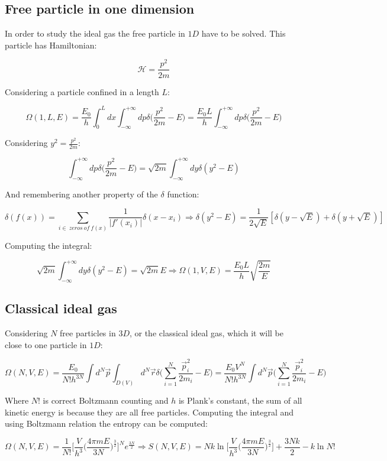 	\subsection{Free particle in one dimension}
	In order to study the ideal gas the free particle in $1D$ have to be solved.
	This particle has Hamiltonian:

	$$\mathcal{H} = \frac{p^2}{2m}$$

	Considering a particle confined in a length $L$:

	$$\Omega(1, L, E) = \frac{E_0}{h}\int_0^Ldx\int_{-\infty}^{+\infty}dp\delta\biggl(\frac{p^2}{2m}-E\biggr) = \frac{E_0L}{h}\int_{-\infty}^{+\infty}dp\delta\biggl(\frac{p^2}{2m}-E\biggr)$$

	Considering $y^2 = \frac{p^2}{2m}$:

	$$\int_{-\infty}^{+\infty}dp\delta\biggl(\frac{p^2}{2m}-E\biggr) = \sqrt{2m}\int_{-\infty}^{+\infty}dy\delta(y^2-E)$$

	And remembering another property of the $\delta$ function:

	$$\delta(f(x)) = \sum\limits_{i\in\ zeros\ of\ f(x)}\frac{1}{|f'(x_i)|}\delta(x-x_i)\Rightarrow\delta(y^2-E) = \frac{1}{2\sqrt{E}}[\delta(y-\sqrt{E}) + \delta(y+\sqrt{E})]$$

	Computing the integral:

	$$\sqrt{2m}\int_{-\infty}^{+\infty}dy\delta(y^2-E) = \sqrt{2m}{E}\Rightarrow\Omega(1, V, E) = \frac{E_0L}{h}\sqrt{\frac{2m}{E}}$$

	\subsection{Classical ideal gas}
	Considering $N$ free particles in $3D$, or the classical ideal gas, which it will be close to one particle in $1D$:

	$$\Omega(N, V, E) = \frac{E_0}{N!h^{3N}}\int d^N\vec{p}\int_{D(V)}d^N\vec{r}\delta\biggl(\sum\limits_{i=1}^N\frac{\vec{p}^2_i}{2m_i}-E\biggr) = \frac{E_0V^N}{N!h^{3N}}\int d^N\vec{p}\biggl(\sum\limits_{i=1}^N\frac{\vec{p}_i^2}{2m_i}-E\biggr)$$

	Where $N!$ is correct Boltzmann counting and $h$ is Plank's constant, the sum of all kinetic energy is because they are all free particles.
	Computing the integral and using Boltzmann relation the entropy can be computed:

	$$\Omega(N, V, E) = \frac{1}{N!}\biggl[\frac{V}{h^3}\biggl(\frac{4\pi m E}{3N}\biggr)^{\frac{3}{2}}\biggr]^Ne^{\frac{3N}{2}}\Rightarrow S(N, V, E) = Nk\ln\biggl[\frac{V}{h^3}\biggl(\frac{4\pi mE}{3N}\biggr)^{\frac{3}{2}}\biggr] + \frac{3Nk}{2}-k\ln N!$$


